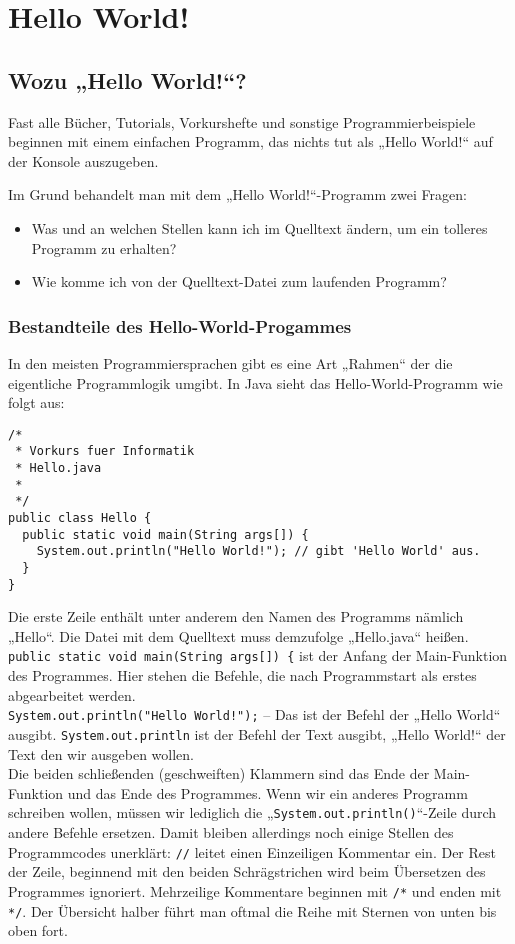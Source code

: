 \chapter {Hello World!}
\lstset{language=Java}

\section {Wozu „Hello World!“?}

Fast alle Bücher, Tutorials, Vorkurshefte und sonstige Programmierbeispiele beginnen mit einem einfachen Programm, das nichts tut als „Hello World!“ auf der Konsole auszugeben.

Im Grund behandelt man mit dem „Hello World!“-Programm zwei Fragen:
\begin{itemize}
\item Was und an welchen Stellen kann ich im Quelltext ändern, um ein tolleres Programm zu erhalten?
\item Wie komme ich von der Quelltext-Datei zum laufenden Programm?
\end{itemize}

\subsection{Bestandteile des Hello-World-Progammes}
In den meisten Programmiersprachen gibt es eine Art „Rahmen“ der die eigentliche Programmlogik umgibt.
In Java sieht das Hello-World-Programm wie folgt aus: 
\begin{lstlisting}
/*
 * Vorkurs fuer Informatik
 * Hello.java
 *
 */
public class Hello {
  public static void main(String args[]) {
    System.out.println("Hello World!");	// gibt 'Hello World' aus.
  }
}
\end{lstlisting}

Die erste Zeile enthält unter anderem den Namen des Programms nämlich „Hello“. Die Datei mit dem Quelltext muss demzufolge „Hello.java“ heißen. \\
\lstinline$public static void main(String args[]) {$ ist der Anfang der Main-Funktion des Programmes. Hier stehen die Befehle, die nach Programmstart als erstes abgearbeitet werden. \\
\lstinline$System.out.println("Hello World!");$ – Das ist der Befehl der „Hello World“ ausgibt. \lstinline$System.out.println$ ist der Befehl der Text ausgibt, „Hello World!“ der Text den wir ausgeben wollen. \\
Die beiden schließenden (geschweiften) Klammern sind das Ende der Main-Funktion und das Ende des Programmes. 
Wenn wir ein anderes Programm schreiben wollen, müssen wir lediglich die „\lstinline$System.out.println()$“-Zeile durch andere Befehle ersetzen.
Damit bleiben allerdings noch einige Stellen des Programmcodes unerklärt: \lstinline$//$ leitet einen Einzeiligen Kommentar ein. Der Rest der Zeile, beginnend mit den beiden Schrägstrichen wird beim Übersetzen des Programmes ignoriert.
Mehrzeilige Kommentare beginnen mit \lstinline$/*$ und enden mit \lstinline$*/$. Der Übersicht halber führt man oftmal die Reihe mit Sternen von unten bis oben fort.


